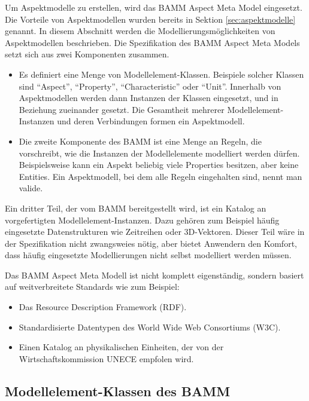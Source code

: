 Um Aspektmodelle zu erstellen, wird das BAMM Aspect Meta Model eingesetzt. Die Vorteile von Aspektmodellen wurden bereits in Sektion \ref{sec:aspektmodelle} genannt. In diesem Abschnitt werden die Modellierungsmöglichkeiten von Aspektmodellen beschrieben. Die Spezifikation des BAMM Aspect Meta Models setzt sich aus zwei Komponenten zusammen.
\begin{itemize}
	\item Es definiert eine Menge von Modellelement-Klassen. Beispiele solcher Klassen sind "`Aspect"', "`Property"', "`Characteristic"' oder "`Unit"'. Innerhalb von Aspektmodellen werden dann Instanzen der Klassen eingesetzt, und in Beziehung zueinander gesetzt. Die Gesamtheit mehrerer Modellelement-Instanzen und deren Verbindungen formen ein Aspektmodell.
	\item Die zweite Komponente des BAMM ist eine Menge an Regeln, die vorschreibt, wie die Instanzen der Modellelemente modelliert werden dürfen. Beispielsweise kann ein Aspekt beliebig viele Properties besitzen, aber keine Entities. Ein Aspektmodell, bei dem alle Regeln eingehalten sind, nennt man valide.
\end{itemize}

Ein dritter Teil, der vom BAMM bereitgestellt wird, ist ein Katalog an vorgefertigten Modellelement-Instanzen. Dazu gehören zum Beispiel häufig eingesetzte Datenstrukturen wie Zeitreihen oder 3D-Vektoren. Dieser Teil wäre in der Spezifikation nicht zwangsweies nötig, aber bietet Anwendern den Komfort, dass häufig eingesetzte Modellierungen nicht selbst modelliert werden müssen.

Das BAMM Aspect Meta Modell ist nicht komplett eigenständig, sondern basiert auf weitverbreitete Standards wie zum Beispiel:
\begin{itemize}
	\item Das Resource Description Framework (RDF). \cite[vgl.][]{w3c2014rdf}
	\item Standardisierte Datentypen des World Wide Web Consortiums (W3C). \cite[vgl.][]{w3c2004datatypes}
	\item Einen Katalog an physikalischen Einheiten, der von der Wirtschaftskommission UNECE empfolen wird. \cite[vgl.][]{unece2021units}
\end{itemize}

	\subsection{Modellelement-Klassen des BAMM}

